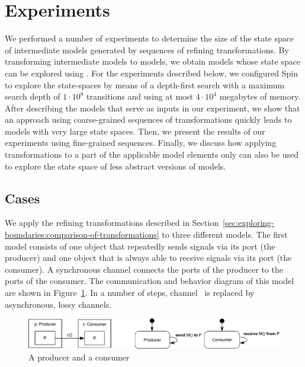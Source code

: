 \section{Experiments}
\label{sec:exploring-boundaries:Experiments}
We performed a number of experiments to determine the size of the state space of intermediate models generated by sequences of refining transformations.
By transforming intermediate \SLCO models to \Promela models, we obtain models whose state space can be explored using \Spin.
For the experiments described below, we configured Spin to explore the state-spaces by means of a depth-first search with a maximum search depth of $ 1\cdot10^8$ transitions and using at most $4\cdot10^4$ megabytes of memory.
After describing the models that serve as inputs in our experiment, we show that an approach using coarse-grained sequences of transformations quickly leads to models with very large state spaces.
Then, we present the results of our experiments using fine-grained sequences.
Finally, we discuss how applying transformations to a part of the applicable model elements only can also be used to explore the state space of less abstract versions of models.

\subsection{Cases}
We apply the refining transformations described in Section~\ref{sec:exploring-boundaries:comparison-of-transformations} to three different models.
The first model consists of one object that repeatedly sends signals via its port (the producer) and one object that is always able to receive signals via its port (the consumer).
A synchronous channel connects the ports of the producer to the ports of the consumer.
The communication and behavior diagram of this model are shown in Figure~\ref{fig:exploring-boundaries:prod-con}.
In a number of steps, channel~ is replaced by asynchronous, lossy channels.

\begin{figure}[hbt]
  \centering
  \includegraphics[scale=0.45]{exploring-boundaries/figs/producer-consumer}
  \caption{A producer and a consumer}
  \label{fig:exploring-boundaries:prod-con}
\end{figure}

